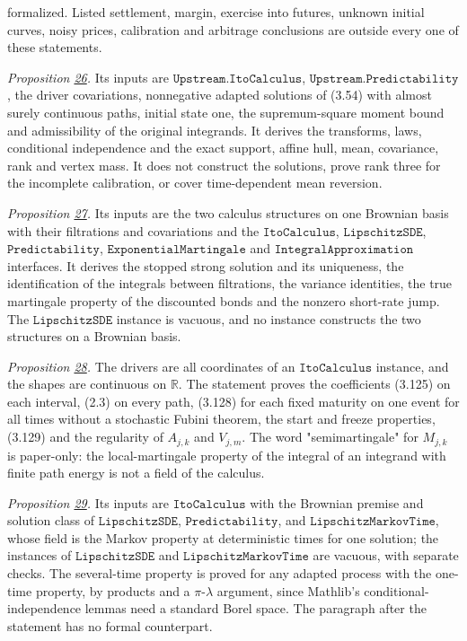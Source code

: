 \documentclass[11pt]{article}
\begin{document}
formalized. Listed settlement, margin, exercise into futures, unknown initial curves, noisy prices, calibration and arbitrage conclusions are outside every one of these statements.

\emph{Proposition \hyperref[res:Proposition-26]{26}.} Its inputs are \(\texttt{Upstream.ItoCalculus}\), \(\texttt{Upstream.Predictability}\), the driver covariations, nonnegative adapted solutions of (3.54) with almost surely continuous paths, initial state one, the supremum-square moment bound and admissibility of the original integrands. It derives the transforms, laws, conditional independence and the exact support, affine hull, mean, covariance, rank and vertex mass. It does not construct the solutions, prove rank three for the incomplete calibration, or cover time-dependent mean reversion.

\emph{Proposition \hyperref[res:Proposition-27]{27}.} Its inputs are the two calculus structures on one Brownian basis with their filtrations and covariations and the \(\texttt{ItoCalculus}\), \(\texttt{LipschitzSDE}\), \(\texttt{Predictability}\), \(\texttt{ExponentialMartingale}\) and \(\texttt{IntegralApproximation}\) interfaces. It derives the stopped strong solution and its uniqueness, the identification of the integrals between filtrations, the variance identities, the true martingale property of the discounted bonds and the nonzero short-rate jump. The \(\texttt{LipschitzSDE}\) instance is vacuous, and no instance constructs the two structures on a Brownian basis.

\emph{Proposition \hyperref[res:Proposition-28]{28}.} The drivers are all coordinates of an \(\texttt{ItoCalculus}\) instance, and the shapes are continuous on \(\mathbb R\). The statement proves the coefficients (3.125) on each interval, (2.3) on every path, (3.128) for each fixed maturity on one event for all times without a stochastic Fubini theorem, the start and freeze properties, (3.129) and the regularity of \(A_{j,k}\) and \(V_{j,m}\). The word "semimartingale" for \(M_{j,k}\) is paper-only: the local-martingale property of the integral of an integrand with finite path energy is not a field of the calculus.

\emph{Proposition \hyperref[res:Proposition-29]{29}.} Its inputs are \(\texttt{ItoCalculus}\) with the Brownian premise and solution class of \(\texttt{LipschitzSDE}\), \(\texttt{Predictability}\), and \(\texttt{LipschitzMarkovTime}\), whose field is the Markov property at deterministic times for one solution; the instances of \(\texttt{LipschitzSDE}\) and \(\texttt{LipschitzMarkovTime}\) are vacuous, with separate checks. The several-time property is proved for any adapted process with the one-time property, by products and a \(\pi\)-\(\lambda\) argument, since Mathlib's conditional-independence lemmas need a standard Borel space. The paragraph after the statement has no formal counterpart.
\end{document}
